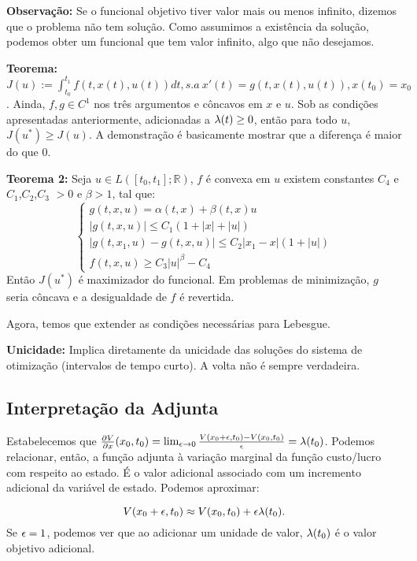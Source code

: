 \textbf{Observação:} Se o funcional objetivo tiver valor mais ou menos infinito, dizemos que o problema não tem solução. Como assumimos a existência da solução, podemos obter um funcional que tem valor infinito, algo que não desejamos. 

\textbf{Teorema:} $J(u) := \int_{t_0}^{t_1} f(t,x(t),u(t))dt, s.a~x'(t) = g(t,x(t),u(t)), x(t_0) = x_0$. Ainda, $f, g \in C^1$ nos três argumentos e côncavos em $x$ e $u$. Sob as condições apresentadas anteriormente, adicionadas a $\lambda(t) \geq 0$, então para todo $u$, $J(u^*) \geq J(u)$. A demonstração é basicamente mostrar que a diferença é maior do que $0$.

\textbf{Teorema 2:} Seja $u \in L([t_0,t_1];\mathbb{R})$, $f$ é convexa em $u$ existem constantes $C_4$ e $C_1$,$C_2$,$C_3$ $>0$ e $\beta > 1$, tal que:
\begin{equation*}
    \begin{cases}
        g(t,x,u) = \alpha (t,x) + \beta (t,x)u \\
        |g(t,x,u)| \leq C_1(1 + |x| + |u|) \\
        |g(t,x_1,u) - g(t,x,u)| \leq C_2|x_1 - x|(1 + |u|) \\
        f(t,x,u) \geq C_3|u|^{\beta} - C_4
    \end{cases}
\end{equation*}
Então $J(u^*)$ é maximizador do funcional. Em problemas de minimização, $g$ seria côncava e a desigualdade de $f$ é revertida. 

Agora, temos que extender as condições necessárias para Lebesgue. 

\textbf{Unicidade:} Implica diretamente da unicidade das soluções do sistema de otimização (intervalos de tempo curto). A volta não é sempre verdadeira.  

\subsection{Interpretação da Adjunta}

Estabelecemos que $\frac{\partial V}{\partial x}(x_0, t_0) = \lim_{\epsilon \to 0} \frac{V(x_0 + \epsilon, t_0) - V(x_0,t_0)}{\epsilon} = \lambda(t_0)$. Podemos relacionar, então, a função adjunta à variação marginal da função custo/lucro com respeito ao estado. É o valor adicional associado com um incremento adicional da variável de estado. Podemos aproximar: 

\begin{equation*}
    V(x_0 + \epsilon,t_0) \approx V(x_0,t_0) + \epsilon\lambda(t_0). 
\end{equation*}
Se $\epsilon = 1$, podemos ver que ao adicionar um unidade de valor, $\lambda(t_0)$ é o valor objetivo adicional. 

